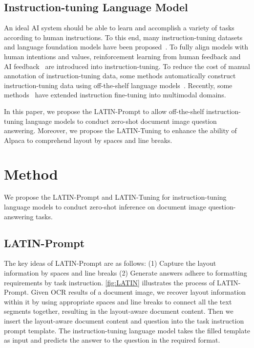 \documentclass[letterpaper]{article} \usepackage{aaai24_preprint}  \usepackage{times}  \usepackage{helvet}  \usepackage{courier}  \usepackage[hyphens]{url}  \usepackage{graphicx} \urlstyle{rm} \def\UrlFont{\rm}  \usepackage{natbib}  \usepackage{caption} \frenchspacing  \setlength{\pdfpagewidth}{8.5in} \setlength{\pdfpageheight}{11in} \usepackage{algorithm}
\begin{document}
\subsection{Instruction-tuning Language Model}
An ideal AI system should be able to learn and accomplish a variety of tasks according to human instructions.
To this end, many instruction-tuning datasets and language foundation models have been proposed~\cite{thoppilanLaMDALanguageModels2022,chungScalingInstructionFinetunedLanguage2022,weiFLAN2022,sanhT02022,mishraNATURALINSTRUCTIONS2022,wangSUP-NATINST2022,xuMultiInstructImprovingMultiModal2022,iyerOPTIMLScalingLanguage2023,longpreFlanCollectionDesigning2023}.
To fully align models with human intentions and values, reinforcement learning from human feedback and AI feedback~\cite{baiTrainingHelpfulHarmlessAssistantRLHF2022,ouyangInstructGPT2022,baiConstitutionalAIHarmlessness2022,OpenAIGPT42023} are introduced into instruction-tuning.
To reduce the cost of manual annotation of instruction-tuning data, some methods automatically construct instruction-tuning data using off-the-shelf language models~\cite{honovichUnnaturalInstructionsTuning2022,wangSelfInstructAligningLanguage2022,StanfordAlpacaInstructionfollowing2023,pengInstructionTuningGPT42023,zhouAutomaticPromptEngineer(APE)2023,xuWizardLM2023}.
Recently, some methods~\cite{zhuMiniGPT42023,daiInstructBLIP2023} have extended instruction fine-tuning into multimodal domains.

In this paper, we propose the LATIN-Prompt to allow off-the-shelf instruction-tuning language models to conduct zero-shot document image question answering.
Moreover, we propose the LATIN-Tuning to enhance the ability of Alpaca to comprehend layout by spaces and line breaks.


\section{Method}
\label{sec:method}
We propose the LATIN-Prompt and LATIN-Tuning for instruction-tuning language models to conduct zero-shot inference on document image question-answering tasks.

\subsection{LATIN-Prompt}
\label{sec:LATIN}
The key ideas of LATIN-Prompt are as follows:
(1) Capture the layout information by spaces and line breaks
(2) Generate answers adhere to formatting requirements by task instruction.
\cref{fig:LATIN} illustrates the process of LATIN-Prompt.
Given OCR results of a document image, we recover layout information within it by using appropriate spaces and line breaks to connect all the text segments together, resulting in the layout-aware document content.
Then we insert the layout-aware document content and question into the task instruction prompt template.
The instruction-tuning language model takes the filled template as input and predicts the answer to the question in the required format.
\end{document}
